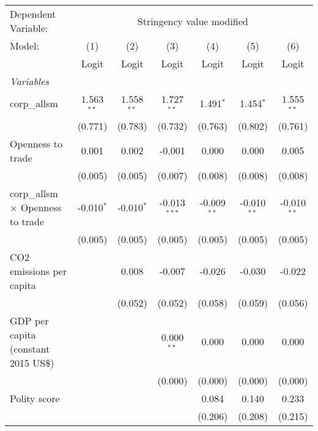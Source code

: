 
\begingroup
\centering
\begin{tabular}{lcccccc}
   \toprule
   Dependent Variable: & \multicolumn{6}{c}{Stringency value modified}\\
   Model:                                   & (1)          & (2)          & (3)            & (4)           & (5)           & (6)\\  
                                            &  Logit       & Logit        & Logit          & Logit         & Logit         & Logit\\  
   \midrule
   \emph{Variables}\\
   corp\_allsm                              & 1.563$^{**}$ & 1.558$^{**}$ & 1.727$^{**}$   & 1.491$^{*}$   & 1.454$^{*}$   & 1.555$^{**}$\\   
                                            & (0.771)      & (0.783)      & (0.732)        & (0.763)       & (0.802)       & (0.761)\\   
   Openness to trade                        & 0.001        & 0.002        & -0.001         & 0.000         & 0.000         & 0.005\\   
                                            & (0.005)      & (0.005)      & (0.007)        & (0.008)       & (0.008)       & (0.008)\\   
   corp\_allsm $\times$ Openness to trade   & -0.010$^{*}$ & -0.010$^{*}$ & -0.013$^{***}$ & -0.009$^{**}$ & -0.010$^{**}$ & -0.010$^{**}$\\   
                                            & (0.005)      & (0.005)      & (0.005)        & (0.005)       & (0.005)       & (0.005)\\   
   CO2 emissions per capita                 &              & 0.008        & -0.007         & -0.026        & -0.030        & -0.022\\   
                                            &              & (0.052)      & (0.052)        & (0.058)       & (0.059)       & (0.056)\\   
   GDP per capita (constant 2015 US\$)      &              &              & 0.000$^{**}$   & 0.000         & 0.000         & 0.000\\   
                                            &              &              & (0.000)        & (0.000)       & (0.000)       & (0.000)\\   
   Polity score                             &              &              &                & 0.084         & 0.140         & 0.233\\   
                                            &              &              &                & (0.206)       & (0.208)       & (0.215)\\   

\end{tabular}
